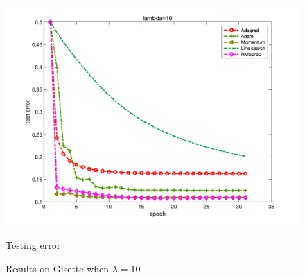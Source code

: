 \documentclass{article}
\begin{document}
\begin{figure}[H]
\begin{minipage}{0.33\linewidth}
		\includegraphics[width=1\linewidth]{./fig/err_g1}
		\caption{Testing error}
	\end{minipage}
\caption*{Results on Gisette when $\lambda=10$}
\end{figure}
\end{document}
